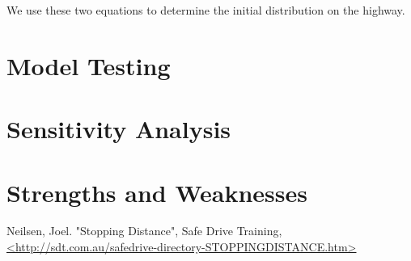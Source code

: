 \documentclass[a4paper,12pt]{article}
\begin{document}
	We use these two equations to determine the initial distribution on the highway.


	\section{Model Testing}
	\section{Sensitivity Analysis}
	\section{Strengths and Weaknesses}

	\begin{thebibliography}{0}
		 Neilsen, Joel. "Stopping Distance", Safe Drive Training,  \url{<http://sdt.com.au/safedrive-directory-STOPPINGDISTANCE.htm>}
	\end{thebibliography}
\end{document}
